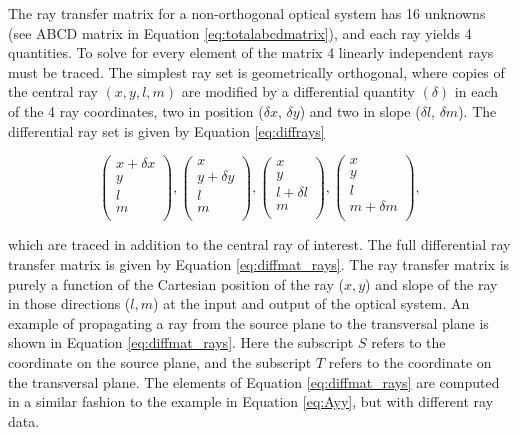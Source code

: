 The ray transfer matrix for a non-orthogonal optical system has 16 unknowns (see ABCD matrix in Equation \ref{eq:totalabcdmatrix}), and each ray yields 4 quantities. To solve for every element of the matrix 4 linearly independent rays must be traced. The simplest ray set is geometrically orthogonal\cite{Greynolds86}, where copies of the central ray $(x,y,l,m)$ are modified by a differential quantity $(\delta)$ in each of the 4 ray coordinates, two in position ($\delta x$, $\delta y$) and two in slope ($\delta l$, $\delta m$). The differential ray set is given by Equation \ref{eq:diffrays}
\begin{center}
    
\begin{equation}
    \begin{pmatrix}
    x + \delta x \\
    y \\
    l \\
    m \\
    \end{pmatrix}
    ,
    \begin{pmatrix}
    x \\
    y + \delta y \\
    l \\
    m \\
    \end{pmatrix}
    ,
    \begin{pmatrix}
    x \\
    y \\
    l + \delta l\\
    m \\
    \end{pmatrix}
    ,
    \begin{pmatrix}
    x \\
    y \\
    l \\
    m + \delta m\\
    \end{pmatrix},
    \label{eq:diffrays}
\end{equation}

\end{center}
which are traced in addition to the central ray of interest. The full differential ray transfer matrix is given by Equation \ref{eq:diffmat_rays}. The ray transfer matrix is purely a function of the Cartesian position of the ray ($x, y$) and  slope of the ray in those directions ($l, m$) at the input and output of the optical system. An example of propagating a ray from the source plane to the transversal plane is shown in Equation \ref{eq:diffmat_rays}. Here the subscript $S$ refers to the coordinate on the source plane, and the subscript $T$ refers to the coordinate on the transversal plane. The elements of Equation \ref{eq:diffmat_rays} are computed in a similar fashion to the example in Equation \ref{eq:Ayy}, but with different ray data.


